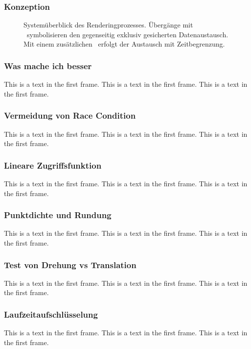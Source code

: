 \documentclass[aspectratio=169]{beamer}
\begin{document}
\begin{frame}
    \frametitle{Konzeption}
    \begin{figure}
        \centering
        
        \caption{Systemüberblick des Renderingprozesses. Übergänge mit \faLock\
            symbolisieren den gegenseitig exklusiv gesicherten Datenaustausch. Mit
            einem zusätzlichen \faHourglassHalf\ erfolgt der Austausch mit
            Zeitbegrenzung.}%
        \label{fig:sysoverview}
    \end{figure}
\end{frame}

\begin{frame}
    \frametitle{Was mache ich besser}
    This is a text in the first frame. This is a text in the first frame. This is a text in the first frame.
\end{frame}

\begin{frame}
    \frametitle{Vermeidung von Race Condition}
    This is a text in the first frame. This is a text in the first frame. This is a text in the first frame.
\end{frame}

\begin{frame}
    \frametitle{Lineare Zugriffsfunktion}
    This is a text in the first frame. This is a text in the first frame. This is a text in the first frame.
\end{frame}

\begin{frame}
    \frametitle{Punktdichte und Rundung}
    This is a text in the first frame. This is a text in the first frame. This is a text in the first frame.
\end{frame}

\begin{frame}
    \frametitle{Test von Drehung vs Translation}
    This is a text in the first frame. This is a text in the first frame. This is a text in the first frame.
\end{frame}

\begin{frame}
    \frametitle{Laufzeitaufschlüsselung}
    This is a text in the first frame. This is a text in the first frame. This is a text in the first frame.
\end{frame}
\end{document}
